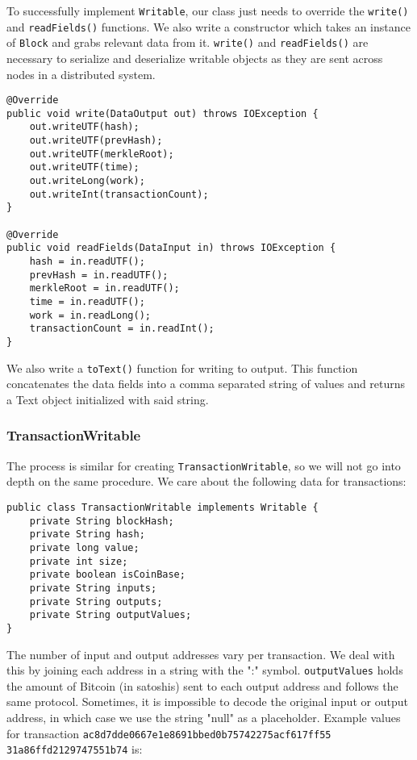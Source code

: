 \documentclass[9pt,twocolumn,twoside]{idsi}
\begin{document}
To successfully implement \lstinline{Writable}, our class just needs to override the \lstinline{write()} and \lstinline{readFields()} functions. We also write a  constructor which takes an instance of \lstinline{Block} and grabs relevant data from it. \lstinline{write()} and \lstinline{readFields()} are necessary to serialize and deserialize writable objects as they are sent across nodes in a distributed system.

\begin{lstlisting}
@Override
public void write(DataOutput out) throws IOException {
    out.writeUTF(hash);
    out.writeUTF(prevHash);
    out.writeUTF(merkleRoot);
    out.writeUTF(time);
    out.writeLong(work);
    out.writeInt(transactionCount);
}

@Override
public void readFields(DataInput in) throws IOException {
    hash = in.readUTF();
    prevHash = in.readUTF();
    merkleRoot = in.readUTF();
    time = in.readUTF();
    work = in.readLong();
    transactionCount = in.readInt();
}
\end{lstlisting}

We also write a \lstinline{toText()} function for writing to output. This function concatenates the data fields into a comma separated string of values and returns a Text object initialized with said string.

\subsubsection{TransactionWritable}
The process is similar for creating \lstinline{TransactionWritable}, so we will not go into depth on the same procedure. We care about the following data for transactions:

\begin{lstlisting}
public class TransactionWritable implements Writable {
    private String blockHash;
    private String hash;
    private long value;
    private int size;
    private boolean isCoinBase;
    private String inputs;
    private String outputs;
    private String outputValues;
}
\end{lstlisting}

The number of input and output addresses vary per transaction. We deal with this by joining each address in a string with the ":" symbol. \lstinline{outputValues} holds the amount of Bitcoin (in satoshis) sent to each output address and follows the same protocol. Sometimes, it is impossible to decode the original input or output address, in which case we use the string "null" as a placeholder. Example values for transaction \lstinline{ac8d7dde0667e1e8691bbed0b75742275acf617ff55} \lstinline{31a86ffd2129747551b74} is:
\end{document}
